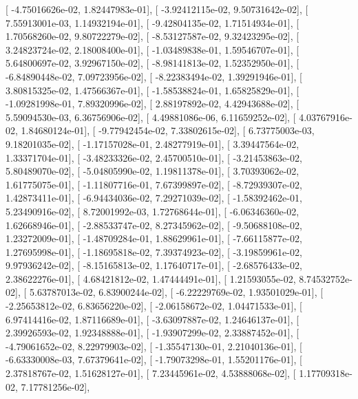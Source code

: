 \documentclass{article}
\begin{document}
       [ -4.75016626e-02,   1.82447983e-01],
       [ -3.92412115e-02,   9.50731642e-02],
       [  7.55913001e-03,   1.14932194e-01],
       [ -9.42804135e-02,   1.71514934e-01],
       [  1.70568260e-02,   9.80722279e-02],
       [ -8.53127587e-02,   9.32423295e-02],
       [  3.24823724e-02,   2.18008400e-01],
       [ -1.03489838e-01,   1.59546707e-01],
       [  5.64800697e-02,   3.92967150e-02],
       [ -8.98141813e-02,   1.52352950e-01],
       [ -6.84890448e-02,   7.09723956e-02],
       [ -8.22383494e-02,   1.39291946e-01],
       [  3.80815325e-02,   1.47566367e-01],
       [ -1.58538824e-01,   1.65825829e-01],
       [ -1.09281998e-01,   7.89320996e-02],
       [  2.88197892e-02,   4.42943688e-02],
       [  5.59094530e-03,   6.36756906e-02],
       [  4.49881086e-06,   6.11659252e-02],
       [  4.03767916e-02,   1.84680124e-01],
       [ -9.77942454e-02,   7.33802615e-02],
       [  6.73775003e-03,   9.18201035e-02],
       [ -1.17157028e-01,   2.48277919e-01],
       [  3.39447564e-02,   1.33371704e-01],
       [ -3.48233326e-02,   2.45700510e-01],
       [ -3.21453863e-02,   5.80489070e-02],
       [ -5.04805990e-02,   1.19811378e-01],
       [  3.70393062e-02,   1.61775075e-01],
       [ -1.11807716e-01,   7.67399897e-02],
       [ -8.72939307e-02,   1.42873411e-01],
       [ -6.94434036e-02,   7.29271039e-02],
       [ -1.58392462e-01,   5.23490916e-02],
       [  8.72001992e-03,   1.72768644e-01],
       [ -6.06346360e-02,   1.62668946e-01],
       [ -2.88533747e-02,   8.27345962e-02],
       [ -9.50688108e-02,   1.23272009e-01],
       [ -1.48709284e-01,   1.88629961e-01],
       [ -7.66115877e-02,   1.27695998e-01],
       [ -1.18695818e-02,   7.39374923e-02],
       [ -3.19859961e-02,   9.97936242e-02],
       [ -8.15165813e-02,   1.17640717e-01],
       [ -2.68576433e-02,   2.38622276e-01],
       [  4.68421812e-02,   1.47444491e-01],
       [  1.21593055e-02,   8.74532752e-02],
       [  5.63787013e-02,   6.83900244e-02],
       [ -6.22229769e-02,   1.93501029e-01],
       [ -2.25653812e-02,   6.83656220e-02],
       [ -2.06158672e-02,   1.04471533e-01],
       [  6.97414416e-02,   1.87116689e-01],
       [ -3.63097887e-02,   1.24646137e-01],
       [  2.39926593e-02,   1.92348888e-01],
       [ -1.93907299e-02,   2.33887452e-01],
       [ -4.79061652e-02,   8.22979903e-02],
       [ -1.35547130e-01,   2.21040136e-01],
       [ -6.63330008e-03,   7.67379641e-02],
       [ -1.79073298e-01,   1.55201176e-01],
       [  2.37818767e-02,   1.51628127e-01],
       [  7.23445961e-02,   4.53888068e-02],
       [  1.17709318e-02,   7.17781256e-02],
\end{document}
